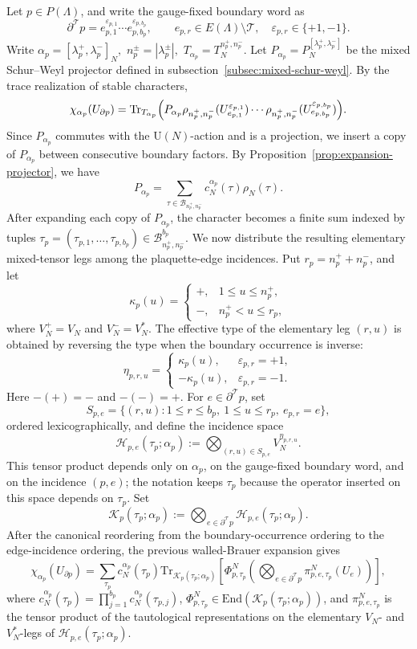 \documentclass[11pt,a4paper,reqno]{amsart}
\theoremstyle{definition}
\theoremstyle{remark}
\newcommand\U{{\mathrm U}}
\newcommand\Tr{{\mathrm{Tr}}}
\newcommand\End{{\mathrm{End}}}
\begin{document}
Let $p\in P(\Lambda)$, and write the gauge-fixed boundary word as
\[
\partial^{\mathcal T} p=e_{p,1}^{\varepsilon_{p,1}}\cdots e_{p,b_p}^{\varepsilon_{p,b_p}}, \qquad e_{p,r}\in E(\Lambda)\setminus\mathcal T,\quad \varepsilon_{p,r}\in\{+1,-1\}.
\]
Write $\alpha_p=[\lambda_p^+,\lambda_p^-]_N,$ $n_p^\pm=|\lambda_p^\pm|,$ $T_{\alpha_p}=T^{n_p^+,n_p^-}_N.$ Let $P_{\alpha_p}=P_N^{[\lambda_p^+,\lambda_p^-]}$ be the mixed Schur--Weyl projector defined in subsection~\ref{subsec:mixed-schur-weyl}. By the trace realization of stable characters,
\[
\chi_{\alpha_p}(U_{\partial p})=\Tr_{T_{\alpha_p}}\Bigl(P_{\alpha_p}\rho_{n_p^+,n_p^-}(U_{e_{p,1}}^{\varepsilon_{p,1}})\cdots\rho_{n_p^+,n_p^-}(U_{e_{p,b_p}}^{\varepsilon_{p,b_p}})\Bigr).
\]
Since $P_{\alpha_p}$ commutes with the $\U(N)$-action and is a projection, we insert a copy of $P_{\alpha_p}$ between consecutive boundary factors. By Proposition~\ref{prop:expansion-projector}, we have
\[
P_{\alpha_p}=\sum_{\tau\in \mathcal B_{n_p^+,n_p^-}}c_N^{\alpha_p}(\tau)\rho_N(\tau).
\]
After expanding each copy of $P_{\alpha_p}$, the character becomes a finite sum indexed by tuples $\tau_p=(\tau_{p,1},\ldots,\tau_{p,b_p}) \in \mathcal B_{n_p^+,n_p^-}^{ b_p}.$ We now distribute the resulting elementary mixed-tensor legs among the plaquette-edge incidences. Put $r_p=n_p^++n_p^-$, and let
\[
\kappa_p(u)=
\begin{cases}
+, & 1\leq u\leq n_p^+,\\
-, & n_p^+<u\leq r_p,
\end{cases}
\]
where $V_N^+=V_N$ and $V_N^-=V_N^*$. The effective type of the elementary leg $(r,u)$ is obtained by reversing the type when the boundary occurrence is inverse:
\[
\eta_{p,r,u}=
\begin{cases}
\kappa_p(u), & \varepsilon_{p,r}=+1,\\
-\kappa_p(u), & \varepsilon_{p,r}=-1.
\end{cases}
\]
Here $-(+)=-$ and $-(-)=+$. For $e\in\partial^{\mathcal T} p$, set
\[
S_{p,e}=\{(r,u):1\leq r\leq b_p,\ 1\leq u\leq r_p,\ e_{p,r}=e\},
\]
ordered lexicographically, and define the incidence space
\[
\mathcal H_{p,e}(\tau_p;\alpha_p):=\bigotimes_{(r,u)\in S_{p,e}} V_N^{\eta_{p,r,u}} .
\]
This tensor product depends only on $\alpha_p$, on the gauge-fixed boundary word, and on the incidence $(p,e)$; the notation keeps $\tau_p$ because the operator inserted on this space depends on $\tau_p$. Set
\[
\mathcal K_p(\tau_p;\alpha_p):=\bigotimes_{e\in\partial^{\mathcal T} p} \mathcal H_{p,e}(\tau_p;\alpha_p).
\]
After the canonical reordering from the boundary-occurrence ordering to the edge-incidence ordering, the previous walled-Brauer expansion gives
\[
\chi_{\alpha_p}(U_{\partial p})=\sum_{\tau_p}c_N^{\alpha_p}(\tau_p)\Tr_{\mathcal K_p(\tau_p;\alpha_p)}\left[\Phi^N_{p,\tau_p}\left(\bigotimes_{e\in\partial^{\mathcal T} p}\pi^N_{p,e,\tau_p}(U_e)\right)\right],
\]
where $c_N^{\alpha_p}(\tau_p)=\prod_{j=1}^{b_p}c_N^{\alpha_p}(\tau_{p,j})$, $\Phi^N_{p,\tau_p}\in\End(\mathcal K_p(\tau_p;\alpha_p))$, and $\pi^N_{p,e,\tau_p}$ is the tensor product of the tautological representations on the elementary $V_N$- and $V_N^*$-legs of $\mathcal H_{p,e}(\tau_p;\alpha_p)$.
\end{document}
